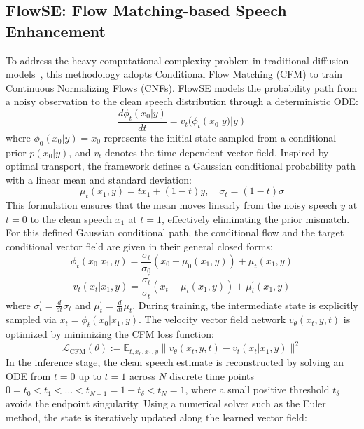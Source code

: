 \documentclass[cameraready]{Interspeech}
\begin{document}
\subsection{FlowSE: Flow Matching-based Speech Enhancement}
To address the heavy computational complexity problem in traditional diffusion models~\cite{10888274}, this methodology adopts Conditional Flow Matching (CFM) to train Continuous Normalizing Flows (CNFs). FlowSE models the probability path from a noisy observation to the clean speech distribution through a deterministic ODE:
\begin{equation}
    \frac{d\phi_{t}(x_{0}|y)}{dt}=v_{t}(\phi_{t}(x_{0}|y)|y)
\end{equation}
where $\phi_{0}(x_{0}|y)=x_{0}$ represents the initial state sampled from a conditional prior $p(x_0|y)$, and $v_t$ denotes the time-dependent vector field. Inspired by optimal transport, the framework defines a Gaussian conditional probability path with a linear mean and standard deviation:
\begin{equation}
    \mu_{t}(x_{1},y) =tx_1 + (1-t)y, \quad \sigma_{t} = (1-t)\sigma
\end{equation}
This formulation ensures that the mean moves linearly from the noisy speech $y$ at $t=0$ to the clean speech $x_1$ at $t=1$, effectively eliminating the prior mismatch. For this defined Gaussian conditional path, the conditional flow and the target conditional vector field are given in their general closed forms:
\begin{equation}
    \phi_{t}(x_{0}|x_{1},y)=\frac{\sigma_{t}}{\sigma_{0}}(x_{0}-\mu_{0}(x_{1},y))+\mu_{t}(x_{1},y)
\end{equation}
\begin{equation}
    v_{t}(x_{t}|x_{1},y)=\frac{\sigma_{t}^{\prime}}{\sigma_{t}}(x_{t}-\mu_{t}(x_{1},y))+\mu_{t}^{\prime}(x_{1},y)
\end{equation}
where $\sigma_{t}^{\prime}=\frac{d}{dt}\sigma_{t}$ and $\mu_{t}^{\prime}=\frac{d}{dt}\mu_{t}$. During training, the intermediate state is explicitly sampled via $x_t = \phi_t(x_0 | x_1, y)$. The velocity vector field network $v_{\theta}(x_{t},y,t)$ is optimized by minimizing the CFM loss function:
\begin{equation}
    \mathcal{L}_{\text{CFM}}(\theta) := \mathbb{E}_{t,x_0,x_1,y} \bigl\lVert v_{\theta}(x_t,y,t) - v_{t}(x_t | x_1, y) \rVert^2
\end{equation}
In the inference stage, the clean speech estimate is reconstructed by solving an ODE from $t=0$ up to $t=1$ across $N$ discrete time points $0 = t_0 < t_1 < \dots < t_{N-1} = 1-t_\delta < t_N = 1$, where a small positive threshold $t_\delta$ avoids the endpoint singularity. Using a numerical solver such as the Euler method, the state is iteratively updated along the learned vector field:
\end{document}
